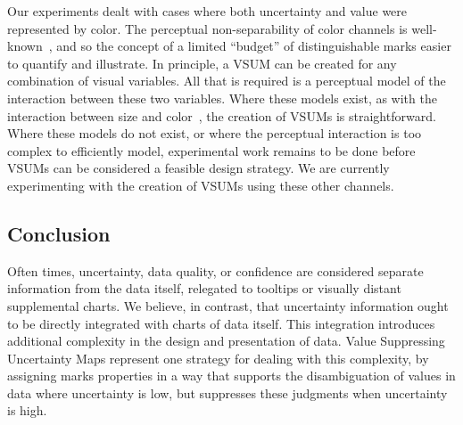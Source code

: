 \documentclass{vgtc}                          %
\begin{document}
Our experiments dealt with cases where both uncertainty and value were represented by color. The perceptual non-separability of color channels is well-known~\cite{ware2012information}, and so the concept of a limited ``budget'' of distinguishable marks easier to quantify and illustrate. In principle, a VSUM can be created for any combination of visual variables. All that is required is a perceptual model of the interaction between these two variables. Where these models exist, as with the interaction between size and color~\cite{stone2014engineering}, the creation of VSUMs is straightforward. Where these models do not exist, or where the perceptual interaction is too complex to efficiently model, experimental work remains to be done before VSUMs can be considered a feasible design strategy. We are currently experimenting with the creation of VSUMs using these other channels.

\subsection{Conclusion}

Often times, uncertainty, data quality, or confidence are considered separate information from the data itself, relegated to tooltips or visually distant supplemental charts. We believe, in contrast, that uncertainty information ought to be directly integrated with charts of data itself. This integration introduces additional complexity in the design and presentation of data. Value Suppressing Uncertainty Maps represent one strategy for dealing with this complexity, by assigning marks properties in a way that supports the disambiguation of values in data where uncertainty is low, but suppresses these judgments when uncertainty is high. 


%

%
%
%


\end{document}
